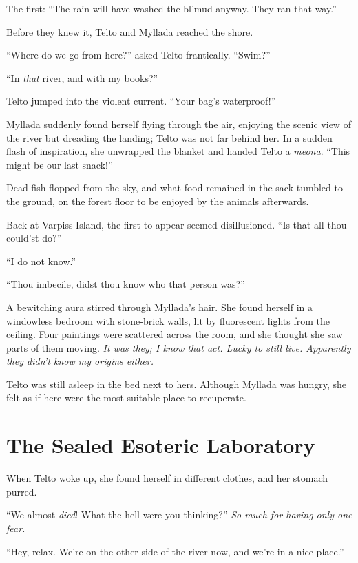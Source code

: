 The first: ``The rain will have washed the bl'mud anyway. They ran that way.''

Before they knew it, Telto and Myllada reached the shore.

``Where do we go from here?'' asked Telto frantically. ``Swim?''

``In \emph{that} river, and with my books?''

Telto jumped into the violent current. ``Your bag's waterproof!''

Myllada suddenly found herself flying through the air, enjoying the scenic view of the river but dreading the landing; Telto was not far behind her. In a sudden flash of inspiration, she unwrapped the blanket and handed Telto a \emph{meona}. ``This might be our last snack!''

Dead fish flopped from the sky, and what food remained in the sack tumbled to the ground, on the forest floor to be enjoyed by the animals afterwards.

\centeredstars

Back at Varpiss Island, the first to appear seemed disillusioned. ``Is that all thou could'st do?''

``I do not know.''

``Thou imbecile, didst thou know who that person was?''

\centeredstars

A bewitching aura stirred through Myllada's hair. She found herself in a windowless bedroom with stone-brick walls, lit by fluorescent lights from the ceiling. Four paintings were scattered across the room, and she thought she saw parts of them moving. \emph{It was they; I know that act. Lucky to still live. Apparently they didn't know my origins either.}

Telto was still asleep in the bed next to hers. Although Myllada was hungry, she felt as if here were the most suitable place to recuperate.

\chapter{The Sealed Esoteric Laboratory}

When Telto woke up, she found herself in different clothes, and her stomach purred.

``We almost \emph{died}! What the hell were you thinking?'' \emph{So much for having only one fear.}

``Hey, relax. We're on the other side of the river now, and we're in a nice place.''

